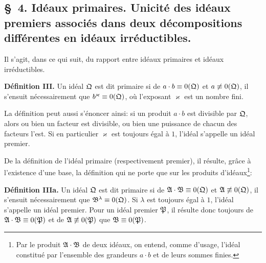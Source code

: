 \subsection*{\S~4. Idéaux primaires. Unicité des idéaux premiers associés dans deux décompositions différentes en idéaux irréductibles.}

Il s'agit, dans ce qui suit, du rapport entre idéaux primaires et idéaux irréductibles.

\textbf{Définition III.} Un idéal $\mathfrak{Q}$ est dit primaire si de $a\cdot b\equiv0(\mathfrak{Q})$ et $a\not\equiv0(\mathfrak{Q})$, il s'ensuit nécessairement que $b^\varkappa\equiv0(\mathfrak{Q})$, où l'exposant $\varkappa$ est un nombre fini.

La définition peut aussi s'énoncer ainsi: si un produit $a\cdot b$ est divisible par $\mathfrak{Q}$, alors ou bien un facteur est divisible, ou bien une puissance de chacun des facteurs l'est. Si en particulier $\varkappa$ est toujours égal à $1$, l'idéal s'appelle un idéal premier.

De la définition de l'idéal primaire (respectivement premier), il résulte, grâce à l'existence d'une base, la définition qui ne porte que sur les produits d'idéaux\footnote{Par le produit $\mathfrak{A}\cdot\mathfrak{B}$ de deux idéaux, on entend, comme d'usage, l'idéal constitué par l'ensemble des grandeurs $a\cdot b$ et de leurs sommes finies.}:

\textbf{Définition IIIa.} Un idéal $\mathfrak{Q}$ est dit primaire si de $\mathfrak{A}\cdot\mathfrak{B}\equiv0(\mathfrak{Q})$ et $\mathfrak{A}\not\equiv0(\mathfrak{Q})$, il s'ensuit nécessairement que $\mathfrak{B}^\lambda\equiv0(\mathfrak{Q})$. Si $\lambda$ est toujours égal à $1$, l'idéal s'appelle un idéal premier. Pour un idéal premier $\mathfrak{P}$, il résulte donc toujours de $\mathfrak{A}\cdot\mathfrak{B}\equiv0(\mathfrak{P})$ et de $\mathfrak{A}\not\equiv0(\mathfrak{P})$ que $\mathfrak{B}\equiv0(\mathfrak{P})$.

